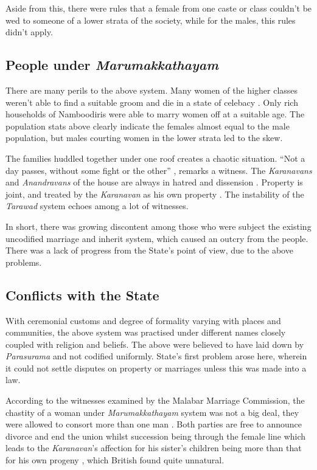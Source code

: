 \documentclass[a4paper]{article}
\begin{document}
Aside from this, there were rules that a female
from one caste or class couldn't be wed to someone
of a lower strata of the society, while for the
males, this rules didn't apply.

\subsection{People under \emph{Marumakkathayam}}
There are many perils to the above system. Many
women of the higher classes weren't able to find a
suitable groom and die in a state of celebacy
\cite[127-128]{logan1887malabar}. Only rich
households of Namboodiris were able to marry women
off at a suitable age. The population stats above
clearly indicate the females almost equal to the
male population, but males courting women in the
lower strata led to the skew. 

The families huddled together under one roof
creates a chaotic situation. ``Not a day passes,
without some fight or the other''
\cite[55]{menon1894report}, remarks a witness.
The \emph{Karanavans} and \emph{Anandravans} of
the house are always in hatred and dissension
\cite[55]{menon1894report}. Property is joint, and
treated by the \emph{Karanavan} as his own
property \cite[55]{menon1894report}. The
instability of the \emph{Tarawad} system echoes
among a lot of witnesses.

In short, there was growing discontent among those
who were subject the existing uncodified marriage
and inherit system, which caused an outcry from
the people. There was a lack of progress from the
State's point of view, due to the above problems.

\subsection{Conflicts with the State}
With ceremonial customs and degree of formality
varying with places and communities, the above
system was practised under different names closely
coupled with religion and beliefs. The above were
believed to have laid down by \emph{Parasurama}
\cite[24]{menon1894report} and not codified
uniformly. State's first problem
arose here, wherein it could not settle disputes
on property or marriages unless this was made into
a law. 

According to the witnesses examined by the Malabar
Marriage Commission, the chastity of a woman
under \emph{Marumakkathayam} system was not a big
deal, they were allowed to consort more than one
man \cite[24]{menon1894report}. Both parties are
free to announce divorce and end the union whilst
succession being through the female line which
leads to the \emph{Karanavan}'s affection for his
sister's children being more than that for his own
progeny \cite[262]{panikkar1918some}, which
British found quite unnatural.
\end{document}
